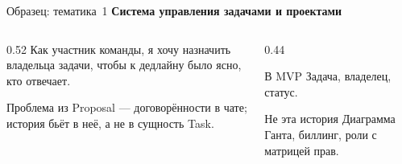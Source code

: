 \begin{frame}{Образец: тематика~1}
  \vspace{0.15em}
  {\small\textbf{Система управления задачами и проектами}}

  \vspace{0.45em}
  \begin{columns}[T]
    \begin{column}{0.52\textwidth}
      Как участник команды, я хочу назначить владельца задачи, чтобы к дедлайну было ясно, кто отвечает.

      \medskip
      Проблема из Proposal --- договорённости в чате; история бьёт в неё, а не в \flqq сущность Task\frqq.
    \end{column}
    \begin{column}{0.44\textwidth}
      \begin{block}{В MVP}
        Задача, владелец, статус.
      \end{block}
      \begin{block}{Не эта история}
        Диаграмма Ганта, биллинг,
        роли с матрицей прав.
      \end{block}
    \end{column}
  \end{columns}
\end{frame}

